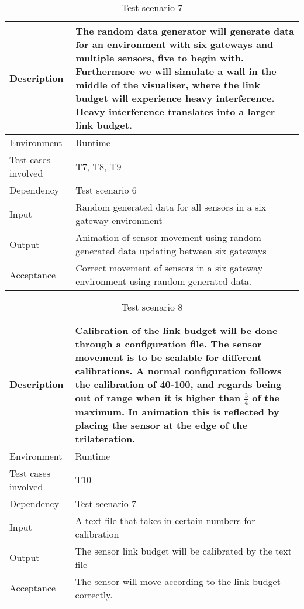 \documentclass[../document]{subfiles}
\begin{document}
\begin{table}[H]
\caption{Test scenario 7}
\centering
\begin{tabularx}{\textwidth}{|L{3cm}|X|}
	\hline
	Description
	&The random data generator will generate data for an environment with six gateways and multiple sensors, five to begin with. Furthermore we will simulate a wall in the middle of the visualiser, where the link budget will experience heavy interference. Heavy interference translates into a larger link budget.
	\\ \hline Environment
	&Runtime
	\\ \hline Test cases involved
	&T7, T8, T9
	\\ \hline Dependency
	&Test scenario 6
	\\ \hline Input
	&Random generated data for all sensors in a six gateway environment
	\\ \hline Output
	&Animation of sensor movement using random generated data updating between six gateways
	\\ \hline Acceptance
	&Correct movement of sensors in a six gateway environment using random generated data.
	\\ \hline 
\end{tabularx}
\end{table}

\begin{table}[H]
\caption{Test scenario 8}
\centering
\begin{tabularx}{\textwidth}{|L{3cm}|X|}
	\hline
	Description
	&Calibration of the link budget will be done through a configuration file. The sensor movement is to be scalable for different calibrations. A normal configuration follows the calibration of 40-100, and regards being out of range when it is higher than $\frac{3}{4}$ of the maximum. In animation this is reflected by placing the sensor at the edge of the trilateration.
	\\ \hline Environment
	&Runtime
	\\ \hline Test cases involved
	&T10
	\\ \hline Dependency
	&Test scenario 7
	\\ \hline Input
	&A text file that takes in certain numbers for calibration
	\\ \hline Output
	&The sensor link budget will be calibrated by the text file
	\\ \hline Acceptance
	&The sensor will move according to the link budget correctly.
	\\ \hline 
\end{tabularx}
\end{table}
\end{document}
